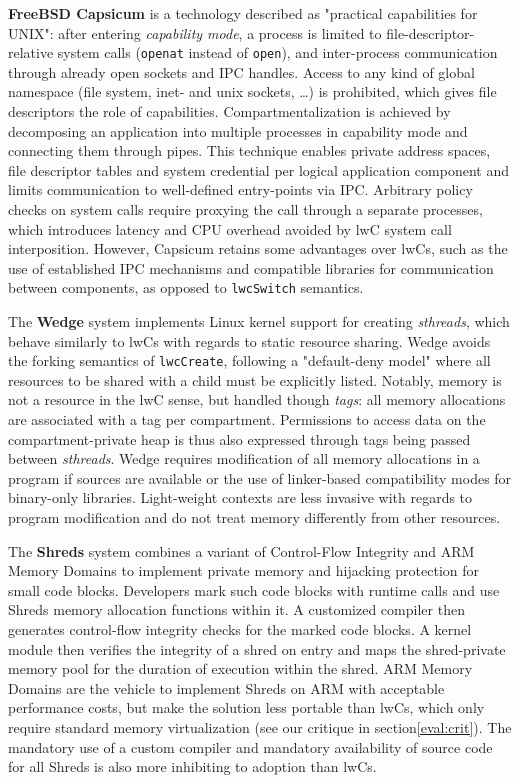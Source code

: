 \documentclass[10pt,twocolumn,a4paper]{article}
\begin{document}
\textbf{FreeBSD Capsicum} is a technology described as "practical capabilities for UNIX":
after entering \textit{capability mode}, a process is limited to file-descriptor-relative system calls (\lstinline{openat} instead of \lstinline{open}), and inter-process communication through already open sockets and IPC handles.
Access to any kind of global namespace (file system, inet- and unix sockets, \dots) is prohibited, which gives file descriptors the role of capabilities.
Compartmentalization is achieved by decomposing an application into multiple processes in capability mode and connecting them through pipes.
This technique enables private address spaces, file descriptor tables and system credential per logical application component and limits communication to well-defined entry-points via IPC.
Arbitrary policy checks on system calls require proxying the call through a separate processes, which introduces latency and CPU overhead avoided by lwC system call interposition.
However, Capsicum retains some advantages over lwCs, such as the use of established IPC mechanisms and compatible libraries for communication between components, as opposed to \lstinline{lwcSwitch} semantics.
\cite{watson2010capsicum}


The \textbf{Wedge} system implements Linux kernel support for creating \textit{sthreads}, which behave similarly to lwCs with regards to static resource sharing.
Wedge avoids the forking semantics of \lstinline{lwcCreate}, following a "default-deny model" where all resources to be shared with a child must be explicitly listed.
Notably, memory is not a resource in the lwC sense, but handled though \textit{tags}: all memory allocations are associated with a tag per compartment.
Permissions to access data on the compartment-private heap is thus also expressed through tags being passed between \textit{sthreads}.
Wedge requires modification of all memory allocations in a program if sources are available or the use of linker-based compatibility modes for binary-only libraries.
Light-weight contexts are less invasive with regards to program modification and do not treat memory differently from other resources.
\cite{bittau2008wedge}

The \textbf{Shreds} system combines a variant of Control-Flow Integrity and ARM Memory Domains to implement private memory and hijacking protection for small code blocks.
Developers mark such code blocks with runtime calls and use Shreds memory allocation functions within it.
A customized compiler then generates control-flow integrity checks for the marked code blocks.
A kernel module then verifies the integrity of a shred on entry and maps the shred-private memory pool for the duration of execution within the shred.
ARM Memory Domains are the vehicle to implement Shreds on ARM with acceptable performance costs, but make the solution less portable than lwCs, which only require standard memory virtualization (see our critique in section\ref{eval:crit}).
The mandatory use of a custom compiler and mandatory availability of source code for all Shreds is also more inhibiting to adoption than lwCs.
\cite{chen2016shreds,abadi2009control,armmemorydomains}
\end{document}
